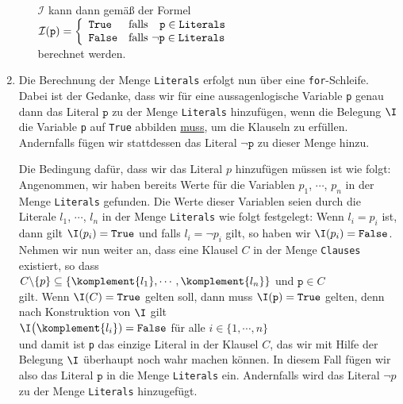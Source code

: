 \begin{enumerate}
\begin{enumerate}
            $\mathcal{I}$ kann dann gemäß der Formel  
            \\[0.2cm]
            \hspace*{1.3cm}
            $\mathcal{I}(\texttt{p}) = \left\{
             \begin{array}{ll}
               \texttt{True}  & \mbox{falls $\hspace*{0.25cm}\texttt{p} \in \texttt{Literals}$} \\
               \texttt{False} & \mbox{falls $\neg\texttt{p} \in \texttt{Literals}$}
             \end{array}\right.
            $
            \\[0.2cm]
            berechnet werden.
      \end{enumerate}
\item Die Berechnung der Menge \texttt{Literals} erfolgt nun über eine \texttt{for}-Schleife.
      Dabei ist der Gedanke, dass wir für eine aussagenlogische Variable \texttt{p} genau dann das Literal
      $\texttt{p}$ zu der Menge \texttt{Literals} hinzufügen, wenn die Belegung $\I$ die Variable \texttt{p}
      auf \texttt{True} abbilden \underline{muss}, um die Klauseln zu erfüllen.  Andernfalls fügen wir
      stattdessen das Literal $\neg\texttt{p}$ zu dieser Menge hinzu.

      Die Bedingung dafür, dass wir das Literal $p$ hinzufügen müssen ist wie folgt:
      Angenommen, wir haben bereits Werte für die Variablen
      $p_1$, $\cdots$, $p_n$ in der Menge \texttt{Literals}  gefunden.
      Die Werte dieser Variablen seien durch die Literale $l_1$, $\cdots$, $l_n$ in der Menge \texttt{Literals}
      wie folgt festgelegt: Wenn $l_i = p_i$ ist, dann gilt $\I(p_i) = \texttt{True}$ 
      und falls $l_i = \neg p_i$ gilt, so haben wir $\I(p_i) = \texttt{False}$.
      Nehmen wir nun weiter an, dass eine Klausel $C$ in der Menge \texttt{Clauses} existiert, so dass
      \\[0.2cm]
      \hspace*{1.3cm}
      $C \backslash \{p\} \subseteq \{ \komplement{l_1}, \cdots, \komplement{l_n} \}$ \quad und \quad $\texttt{p} \in C$
      \\[0.2cm]
      gilt.  Wenn $\I(C) = \texttt{True}$ gelten soll, dann muss $\I(\texttt{p}) = \texttt{True}$ gelten, denn
      nach Konstruktion von $\I$ gilt 
      \\[0.2cm]
      \hspace*{1.3cm}
      $\I\bigl(\komplement{l_i}) = \texttt{False}$ \quad für alle $i \in \{1,\cdots,n\}$
      \\[0.2cm]
      und damit ist \texttt{p} das einzige Literal in der Klausel $C$, das wir mit Hilfe der Belegung $\I$
      überhaupt noch wahr machen können.  In diesem Fall fügen wir also das Literal
      $\texttt{p}$ in die Menge \texttt{Literals} ein.  Andernfalls wird das Literal $\neg p$ zu der Menge
      \texttt{Literals} hinzugefügt.
\end{enumerate}
